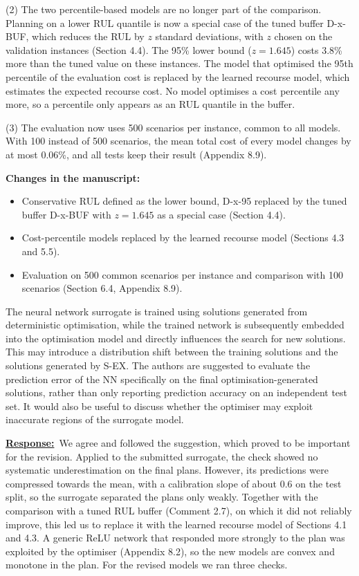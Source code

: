 \documentclass{article}
\newcommand{\response}{\vspace{0.1cm}\noindent\underline{\textbf{Response:}}\ }
\newcommand{\changes}{\vspace{0.1cm}\noindent\textbf{Changes in the manuscript:}}
\begin{document}
(2) The two percentile-based models are no longer part of the comparison. Planning on a lower RUL quantile is now a special case of the tuned buffer D-x-BUF, which reduces the RUL by $z$ standard deviations, with $z$ chosen on the validation instances (Section 4.4). The 95\% lower bound ($z = 1.645$) costs 3.8\% more than the tuned value on these instances. The model that optimised the 95th percentile of the evaluation cost is replaced by the learned recourse model, which estimates the expected recourse cost. No model optimises a cost percentile any more, so a percentile only appears as an RUL quantile in the buffer.

(3) The evaluation now uses 500 scenarios per instance, common to all models. With 100 instead of 500 scenarios, the mean total cost of every model changes by at most 0.06\%, and all tests keep their result (Appendix 8.9).

\changes
\begin{itemize}[nosep]
\item Conservative RUL defined as the lower bound, D-x-95 replaced by the tuned buffer D-x-BUF with $z = 1.645$ as a special case (Section 4.4).
\item Cost-percentile models replaced by the learned recourse model (Sections 4.3 and 5.5).
\item Evaluation on 500 common scenarios per instance and comparison with 100 scenarios (Section 6.4, Appendix 8.9).
\end{itemize}

\begin{cmt}{}{}
The neural network surrogate is trained using solutions generated from deterministic optimisation, while the trained network is subsequently embedded into the optimisation model and directly influences the search for new solutions. This may introduce a distribution shift between the training solutions and the solutions generated by S-EX. The authors are suggested to evaluate the prediction error of the NN specifically on the final optimisation-generated solutions, rather than only reporting prediction accuracy on an independent test set. It would also be useful to discuss whether the optimiser may exploit inaccurate regions of the surrogate model.
\end{cmt}

\response We agree and followed the suggestion, which proved to be important for the revision. Applied to the submitted surrogate, the check showed no systematic underestimation on the final plans. However, its predictions were compressed towards the mean, with a calibration slope of about 0.6 on the test split, so the surrogate separated the plans only weakly. Together with the comparison with a tuned RUL buffer (Comment 2.7), on which it did not reliably improve, this led us to replace it with the learned recourse model of Sections 4.1 and 4.3. A generic ReLU network that responded more strongly to the plan was exploited by the optimiser (Appendix 8.2), so the new models are convex and monotone in the plan. For the revised models we ran three checks.
\end{document}
